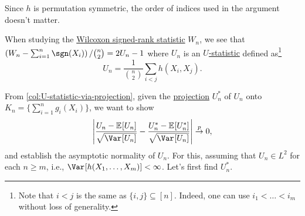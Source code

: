\begin{note}
	Since \(h\) is permutation symmetric, the order of indices used in the argument doesn't matter.
\end{note}

\begin{eg}
	When studying the \hyperref[def:Wilcoxon-signed-rank-statistic]{Wilcoxon signed-rank statistic} \(W_n\), we see that \(\left( W_n - \sum_{i=1}^{n} \sgn (X_i) \right) / \binom{n}{2} = 2U_n - 1\) where \(U_n\) is an \hyperref[def:U-statistic]{\(U\)-statistic} defined as\footnote{Note that \(i < j\) is the same as \(\{ i, j \} \subseteq [n] \). Indeed, one can use \(i_1 < \dots < i_m\) without loss of generality.}
	\[
		U_n = \frac{1}{\binom{n}{2}} \sum_{i < j} h(X_i, X_j).
	\]
\end{eg}

From \autoref{col:U-statistic-via-projection}, given the \hyperref[def:projection]{projection} \(U_n^{\ast} \) of \(U_n\) onto \(K_n = \{ \sum_{i=1}^{n} g_i(X_i) \} \), we want to show
\[
	\left\vert \frac{U_n - \mathbb{E}_{}[U_n] }{\sqrt{\Var_{}[U_n] } } - \frac{U_n^{\ast} - \mathbb{E}_{}[U_n^{\ast} ] }{\sqrt{\Var_{}[U_n] } } \right\vert
	\overset{p}{\to} 0,
\]
and establish the asymptotic normality of \(U_n\). For this, assuming that \(U_n \in L^2\) for each \(n \geq m\), i.e., \(\Var_{}[h(X_1, \dots , X_m)] < \infty \). Let's first find \(U_n^{\ast} \).

